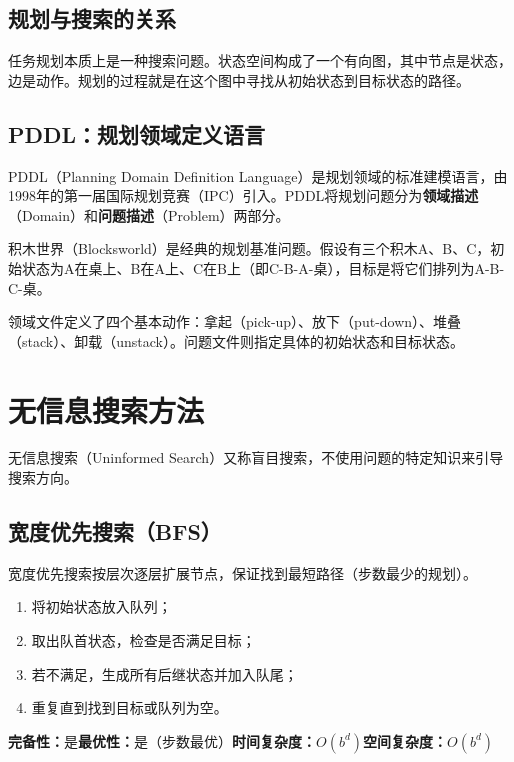 \subsection{规划与搜索的关系}

任务规划本质上是一种搜索问题。状态空间构成了一个有向图，其中节点是状态，边是动作。规划的过程就是在这个图中寻找从初始状态到目标状态的路径。

\subsection{PDDL：规划领域定义语言}

PDDL（Planning Domain Definition Language）是规划领域的标准建模语言，由1998年的第一届国际规划竞赛（IPC）引入。PDDL将规划问题分为\textbf{领域描述}（Domain）和\textbf{问题描述}（Problem）两部分。

\begin{example}[积木世界的PDDL描述]
积木世界（Blocksworld）是经典的规划基准问题。假设有三个积木A、B、C，初始状态为A在桌上、B在A上、C在B上（即C-B-A-桌），目标是将它们排列为A-B-C-桌。

领域文件定义了四个基本动作：拿起（pick-up）、放下（put-down）、堆叠（stack）、卸载（unstack）。问题文件则指定具体的初始状态和目标状态。
\end{example}

\section{无信息搜索方法 \ug}

无信息搜索（Uninformed Search）又称盲目搜索，不使用问题的特定知识来引导搜索方向。

\subsection{宽度优先搜索（BFS）}

宽度优先搜索按层次逐层扩展节点，保证找到最短路径（步数最少的规划）。

\begin{algbox}[title={\textbf{BFS基本思想}}]
\begin{enumerate}
  \item 将初始状态放入队列；
  \item 取出队首状态，检查是否满足目标；
  \item 若不满足，生成所有后继状态并加入队尾；
  \item 重复直到找到目标或队列为空。
\end{enumerate}
\textbf{完备性：}是\quad \textbf{最优性：}是（步数最优）\quad \textbf{时间复杂度：}$O(b^d)$\quad \textbf{空间复杂度：}$O(b^d)$
\end{algbox}


